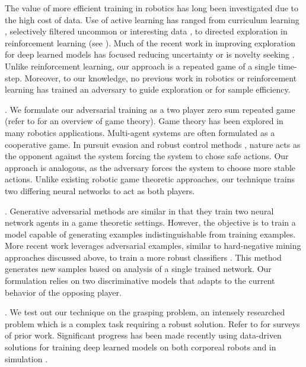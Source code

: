 \documentclass[letterpaper, 10 pt, conference]{ieeeconf}  %
\begin{document}
The value of more efficient training in robotics has long been investigated due to the high cost of data. Use of active learning has ranged from curriculum learning \cite{sanger1994neural}, selectively filtered uncommon or interesting data \cite{dima2004enabling}, to directed exploration in reinforcement learning (see \cite{thrun1992efficient}).  Much of the recent work in improving exploration for deep learned models has focused reducing uncertainty \cite{houthooft20015variational, osband2016deep} or is novelty seeking \cite{bellemare2016unifying, abel2016exploratory}. Unlike reinforcement learning, our approach is a repeated game of a single time-step.  Moreover, to our knowledge, no previous work in robotics or reinforcement learning has trained an adversary to guide exploration or for sample efficiency.

. 
We formulate our adversarial training as a two player zero sum repeated game (refer to \cite{basar1999dynamic} for an overview of game theory). Game theory has been explored in many robotics applications. Multi-agent systems \cite{stone2000multiagent, panait2005cooperative} are often formulated as a cooperative game. In pursuit evasion \cite{lavalle2000robot} and robust control methods \cite{bacsar2008h}, nature acts as the opponent against the system forcing the system to chose safe actions. Our approach is analogous, as the adversary forces the system to choose more stable actions. Unlike existing robotic game theoretic approaches, our technique trains two differing neural networks to act as both players.

. Generative adversarial methods \cite{goodfellow2014generative, dumoulin2016adversarially} are similar in that they train two neural network agents in a game theoretic settings. However, the objective is to train a model capable of generating examples indistinguishable from training examples. More recent work leverages adversarial examples, similar to hard-negative mining approaches discussed above, to train a more robust classifiers \cite{goodfellow2014explaining}. This method generates new samples based on analysis of a single trained network. Our formulation relies on two discriminative models that adapts to the current behavior of the opposing player.

.
We test out our technique on the grasping problem, an intensely researched problem which is a complex task requiring a robust solution. Refer to \cite{bicchi2000robotic, bohg2014data} for surveys of prior work. Significant progress has been made recently using data-driven solutions for training deep learned models on both corporeal robots \cite{lenz2015deep, pinto2016supersizing, levine2016end, levine2016learning} and in simulation \cite{kappler2015leveraging, mahler2016dexnet}.  
\end{document}
